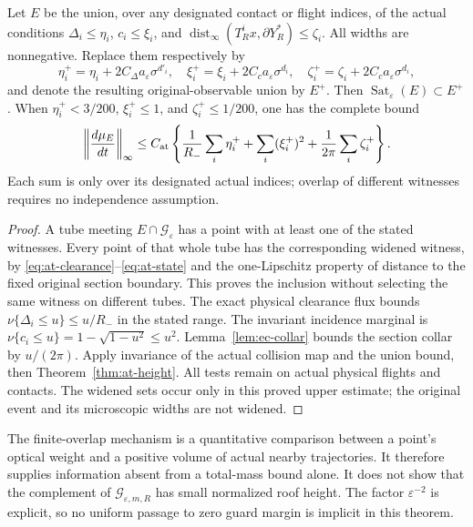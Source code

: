 \begin{corollary}
\label{cor:at-observables}
Let $E$ be the union, over any designated contact or flight
indices, of the actual conditions
$\Delta_i\le\eta_i$, $c_i\le\xi_i$, and
$\operatorname{dist}_\infty(T_R^ix,\partial Y_R^*)\le\zeta_i$.
All widths are nonnegative.  Replace them respectively by
\begin{equation}\label{eq:at-widening}
 \eta_i^+=\eta_i+2C_\Delta a_\varepsilon\sigma^{d'_i},\quad
 \xi_i^+=\xi_i+2C_c a_\varepsilon\sigma^{d_i},\quad
 \zeta_i^+=\zeta_i+2C_c a_\varepsilon\sigma^{d_i},
\end{equation}
and denote the resulting original-observable union by $E^+$.
Then $\operatorname{Sat}_\varepsilon(E)\subset E^+$.
When $\eta_i^+<3/200$, $\xi_i^+\le1$, and
$\zeta_i^+\le1/200$, one has the complete bound
\begin{equation}\label{eq:at-observable-height}
 \left\|\frac{d\mu_E}{dt}\right\|_\infty
 \le C_{\rm at}
 \left\{\frac1{R_-}\sum_i\eta_i^+
              +\sum_i(\xi_i^+)^2
              +\frac1{2\pi}\sum_i\zeta_i^+\right\}.
\end{equation}
Each sum is only over its designated actual indices; overlap of
different witnesses requires no independence assumption.
\end{corollary}
\begin{proof}
A tube meeting $E\cap\mathcal G_\varepsilon$ has a point with
at least one of the stated witnesses.  Every point of that whole
tube has the corresponding widened witness, by
\eqref{eq:at-clearance}--\eqref{eq:at-state} and the
one-Lipschitz property of distance to the fixed original section
boundary.  This proves the inclusion without selecting the same
witness on different tubes.  The exact physical clearance flux
bounds $\nu\{\Delta_i\le u\}\le u/R_-$ in the stated range.
The invariant incidence marginal is
$\nu\{c_i\le u\}=1-\sqrt{1-u^2}\le u^2$.
Lemma~\ref{lem:ec-collar} bounds the section collar by $u/(2\pi)$.
Apply invariance of the actual collision map and the union bound,
then Theorem~\ref{thm:at-height}.  All tests remain on actual
physical flights and contacts.  The widened sets occur only in
this proved upper estimate; the original event and its
microscopic widths are not widened.
\end{proof}

The finite-overlap mechanism is a quantitative comparison between
a point's optical weight and a positive volume of actual nearby
trajectories.  It therefore supplies information absent from a
total-mass bound alone.  It does not show that the complement of
$\mathcal G_{\varepsilon,m,R}$ has small normalized roof height.
The factor $\varepsilon^{-2}$ is explicit, so no uniform passage
to zero guard margin is implicit in this theorem.
